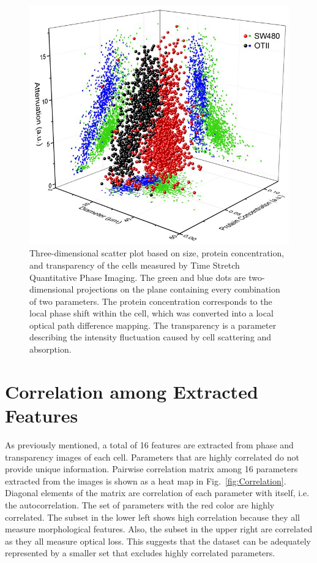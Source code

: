 \documentclass[aps,pra,preprint,superscriptaddress]{revtex4-1}
\begin{document}
\begin{figure}
\includegraphics[scale=0.6]{FigureOTSWScatter.jpg}
\caption{\label{fig:OTSWScatter} Three-dimensional scatter plot based on size, protein concentration, and transparency of the cells measured by Time Stretch Quantitative Phase Imaging. The green and blue dots are two-dimensional projections on the plane containing every combination of two parameters. The protein concentration corresponds to the local phase shift within the cell, which was converted into a local optical path difference mapping. The transparency is a parameter describing the intensity fluctuation caused by cell scattering and absorption.}
\end{figure}

\section{Correlation among Extracted Features}

As previously mentioned, a total of 16 features are extracted from phase and transparency images of each cell. Parameters that are highly correlated do not provide unique information. Pairwise correlation matrix among 16 parameters extracted from the images is shown as a heat map in Fig.~\ref{fig:Correlation}. Diagonal elements of the matrix are correlation of each parameter with itself, i.e. the autocorrelation. The set of parameters with the red color are highly correlated. The subset in the lower left shows high correlation because they all measure morphological features. Also, the subset in the upper right are correlated as they all measure optical loss. This suggests that the dataset can be adequately represented by a smaller set that excludes highly correlated parameters.
\end{document}
